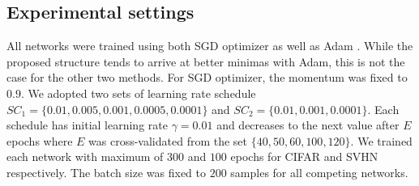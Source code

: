 \documentclass[conference,usletter]{IEEEtran}
\begin{document}
\begin{table*}[bp]	
	\begin{center}
		\caption{CIFAR-10 Classification error (\%)}\label{t2}
	\end{center}
\end{table*}

\begin{table*}[bp]	
	\begin{center}
		\caption{CIFAR-100 Classification error (\%)}\label{t3}
	\end{center}
\end{table*}

\subsection{Experimental settings}
All networks were trained using both SGD optimizer \cite{rumelhart1988learning} as well as Adam \cite{kingma2014adam}. While the proposed structure tends to arrive at better minimas with Adam, this is not the case for the other two methods. For SGD optimizer, the momentum was fixed to $0.9$. We adopted two sets of learning rate schedule $SC_{1}=\{0.01,0.005,0.001,0.0005,0.0001\}$ and $SC_2=\{0.01,0.001,0.0001\}$. Each schedule has initial learning rate $\gamma=0.01$ and decreases to the next value after $E$ epochs where $E$ was cross-validated from the set $\{40,50,60,100,120\}$. We trained each network with maximum of $300$ and $100$ epochs for CIFAR and SVHN respectively. The batch size was fixed to $200$ samples for all competing networks.
\end{document}
